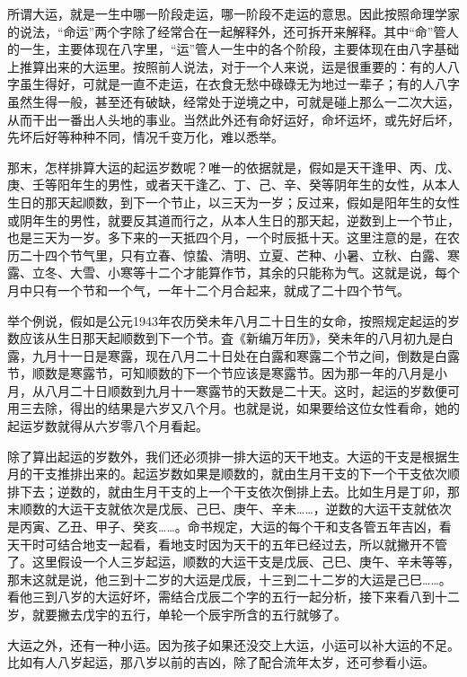 \documentclass[a5paper,oneside,12pt]{ctexbook}
\begin{document}
所谓大运，就是一生中哪一阶段走运，哪一阶段不走运的意思。因此按照命理学家的说法，“命运”两个字除了经常合在一起解释外，还可拆开来解释。其中“命”管人的一生，主要体现在八字里，“运”管人一生中的各个阶段，主要体现在由八字基础上推算出来的大运里。按照前人说法，对于一个人来说，运是很重要的：有的人八字虽生得好，可就是一直不走运，在衣食无愁中碌碌无为地过一辈子；有的人八字虽然生得一般，甚至还有破缺，经常处于逆境之中，可就是碰上那么一二次大运，从而干出一番出人头地的事业。当然此外还有命好运好，命坏运坏，或先好后坏，先坏后好等种种不同，情况千变万化，难以悉举。

那末，怎样排算大运的起运岁数呢？唯一的依据就是，假如是天干逢甲、丙、戊、庚、壬等阳年生的男性，或者天干逢乙、丁、己、辛、癸等阴年生的女性，从本人生日的那天起顺数，到下一个节止，以三天为一岁；反过来，假如是阳年生的女性或阴年生的男性，就要反其道而行之，从本人生日的那天起，逆数到上一个节止，也是三天为一岁。多下来的一天抵四个月，一个时辰抵十天。这里注意的是，在农历二十四个节气里，只有立春、惊蛰、清明、立夏、芒种、小暑、立秋、白露、寒露、立冬、大雪、小寒等十二个才能算作节，其余的只能称为气。这就是说，每个月中只有一个节和一个气，一年十二个月合起来，就成了二十四个节气。

举个例说，假如是公元1943年农历癸未年八月二十日生的女命，按照规定起运的岁数应该从生日那天起顺数到下一个节。査《新编万年历》，癸未年的八月初九是白露，九月十一日是寒露，现在八月二十日处在白露和寒露二个节之间，倒数是白露节，顺数是寒露节，可知顺数的下一个节应该是寒露节。因为那一年的八月是小月，从八月二十日顺数到九月十一寒露节的天数是二十天。这时，起运的岁数便可用三去除，得出的结果是六岁又八个月。也就是说，如果要给这位女性看命，她的起运岁数就得从六岁零八个月看起。

除了算出起运的岁数外，我们还必须排一排大运的天干地支。大运的干支是根据生月的干支推排出来的。起运岁数如果是顺数的，就由生月干支的下一个干支依次顺排下去；逆数的，就由生月干支的上一个干支依次倒排上去。比如生月是丁卯，那末顺数的大运干支就依次是戊辰、己巳、庚午、辛未……，逆数的大运干支就依次是丙寅、乙丑、甲子、癸亥……。命书规定，大运的每个干和支各管五年吉凶，看天干时可结合地支一起看，看地支时因为天干的五年已经过去，所以就撇开不管了。这里假设一个人三岁起运，顺数的大运干支是戊辰、己巳、庚午、辛未等等，那末这就是说，他三到十二岁的大运是戊辰，十三到二十二岁的大运是己巳……。看他三到八岁的大运好坏，需结合戊辰二个字的五行一起分析，接下来看八到十二岁，就要撇去戊宇的五行，单轮一个辰宇所含的五行就够了。

大运之外，还有一种小运。因为孩子如果还没交上大运，小运可以补大运的不足。比如有人八岁起运，那八岁以前的吉凶，除了配合流年太岁，还可参看小运。
\end{document}

